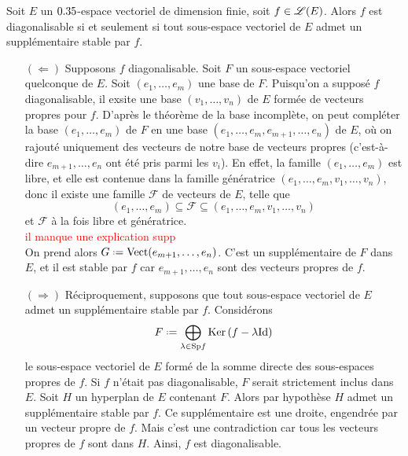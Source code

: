 \begin{prop}{}
    Soit $E$ un $0.35$-espace vectoriel de dimension finie, soit $f \in \mathscr{L}(E)$. Alors $f$ est diagonalisable si et seulement si tout sous-espace vectoriel de $E$ admet un supplémentaire stable par $f$.
\end{prop}

\begin{preuve}
    \begin{itemize}
        \item[$(\Leftarrow)$] Supposons $f$ diagonalisable. Soit $F$ un sous-espace vectoriel quelconque de $E$. Soit $(e_1, \dots, e_m)$ une base de $F$. Puisqu'on a supposé $f$ diagonalisable, il exsite une base $(v_1, \dots, v_n)$ de $E$ formée de vecteurs propres pour $f$. D'après le théorème de la base incomplète, on peut compléter la base $(e_1, \dots, e_m)$ de $F$ en une base $(e_1, \dots, e_m, e_{m+1}, \dots, e_n)$ de $E$, où on rajouté uniquement des vecteurs de notre base de vecteurs propres (c'est-à-dire $e_{m+1}, \dots, e_n$ ont été pris parmi les $v_i$). En effet, la famille $(e_1, \dots, e_m)$ est libre, et elle est contenue dans la famille génératrice $(e_1, \dots, e_m, v_1, \dots, v_n)$, donc il existe une famille $\mathcal{F}$ de vecteurs de $E$, telle que 
        $$(e_1, \dots, e_m) \subseteq \mathcal{F} \subseteq (e_1, \dots, e_m, v_1, \dots, v_n)$$
        et $\mathcal{F}$ à la fois libre et génératrice. \\
        \textcolor{red}{il manque une explication supp} \\
        On prend alors $G \defeq \Vect(e_{m+1}, \dots, e_n)$. C'est un supplémentaire de $F$ dans $E$, et il est stable par $f$ car $e_{m+1}, \dots, e_n$ sont des vecteurs propres de $f$.
        \item[$(\Rightarrow)$] Réciproquement, supposons que tout sous-espace vectoriel de $E$ admet un supplémentaire stable par $f$. Considérons
        $$F \defeq \bigoplus_{\lambda \in \Sp f} \Ker(f - \lambda \Id)$$
        le sous-espace vectoriel de $E$ formé de la somme directe des sous-espaces propres de $f$. Si $f$ n'était pas diagonalisable, $F$ serait strictement inclus dans $E$. Soit $H$ un hyperplan de $E$ contenant $F$. Alors par hypothèse $H$ admet un supplémentaire stable par $f$. Ce supplémentaire est une droite, engendrée par un vecteur propre de $f$. Mais c'est une contradiction car tous les vecteurs propres de $f$ sont dans $H$. Ainsi, $f$ est diagonalisable. 
    \end{itemize}
\end{preuve}

